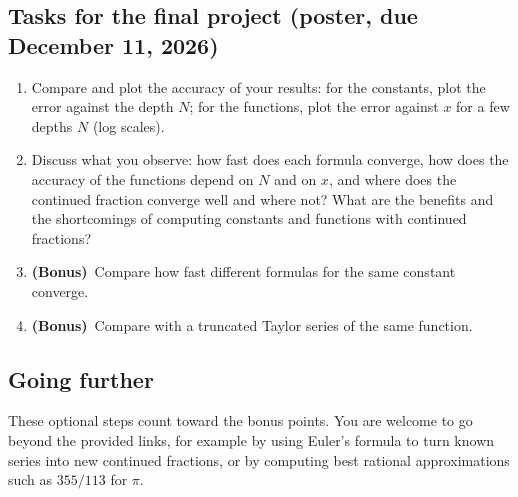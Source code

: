 \documentclass[11pt,a4paper]{article}
\newcommand{\bonus}{\textbf{(Bonus)}}
\begin{document}
\subsection*{Tasks for the final project (poster, due December 11, 2026)}
\begin{enumerate}
  \item Compare and plot the accuracy of your results: for the constants,
        plot the error against the depth $N$; for the functions, plot the
        error against $x$ for a few depths $N$ (log scales).
  \item Discuss what you observe: how fast does each formula converge, how
        does the accuracy of the functions depend on $N$ and on $x$, and
        where does the continued fraction converge well and where not? What
        are the benefits and the shortcomings of computing constants and
        functions with continued fractions?
  \item \bonus\ Compare how fast different formulas for the same constant
        converge.
  \item \bonus\ Compare with a truncated Taylor series of the same
        function.
\end{enumerate}

\subsection*{Going further}
These optional steps count toward the bonus points. You are welcome to go
beyond the provided links, for example by using Euler's formula \cite{euler}
to turn known series into new continued fractions, or by computing best
rational approximations such as $355/113$ for $\pi$.
\end{document}
